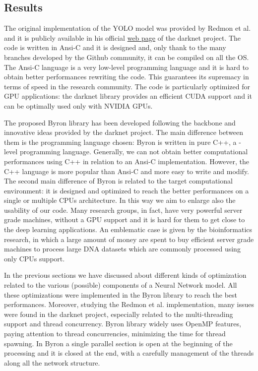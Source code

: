 \documentclass{standalone}
\begin{document}
\subsection[Results]{Results}\label{obj_detection:results}

The original implementation of the YOLO model was provided by Redmon et al. and it is publicly available in his official \href{https://pjreddie.com/darknet/yolo}{web page} of the \textsf{darknet} project.
The code is written in \textsf{Ansi-C} and it is designed and, only thank to the many branches developed by the Github community, it can be compiled on all the OS.
The \textsf{Ansi-C} language is a very low-level programming language and it is hard to obtain better performances rewriting the code.
This guarantees its supremacy in terms of speed in the research community.
The code is particularly optimized for GPU applications: the \textsf{darknet} library provides an efficient CUDA support and it can be optimally used only with NVIDIA GPUs.

The proposed \textsf{Byron} library has been developed following the backbone and innovative ideas provided by the \textsf{darknet} project.
The main difference between them is the programming language chosen: \textsf{Byron} is written in pure \textsf{C++}, a -level programming language.
Generally, we can not obtain better computational performances using \textsf{C++} in relation to an \textsf{Ansi-C} implementation.
However, the \textsf{C++} language is more popular than \textsf{Ansi-C} and more easy to write and modify.
The second main difference of \textsf{Byron} is related to the target computational environment: it is designed and optimized to reach the better performances on a single or multiple CPUs architecture.
In this way we aim to enlarge also the usability of our code.
Many research groups, in fact, have very powerful server grade machines, without a GPU support and it is hard for them to get close to the deep learning applications.
An emblematic case is given by the bioinformatics research, in which a large amount of money are spent to buy efficient server grade machines to process large DNA datasets which are commonly processed using only CPUs support.

In the previous sections we have discussed about different kinds of optimization related to the various (possible) components of a Neural Network model.
All these optimizations were implemented in the \textsf{Byron} library to reach the best performances.
Moreover, studying the Redmon et al. implementation, many issues were found in the \textsf{darknet} project, especially related to the multi-threading support and thread concurrency.
\textsf{Byron} library widely uses OpenMP features, paying attention to thread concurrencies, minimizing the time for thread spawning.
In \textsf{Byron} a single parallel section is open at the beginning of the processing and it is closed at the end, with a carefully management of the threads along all the network structure.
\end{document}
